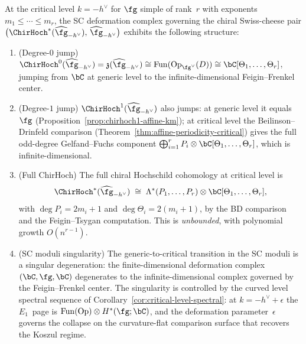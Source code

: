 \begin{conjecture}\label{conj:sc-deformation-critical}
At the critical level $k = -h^\vee$ for $\fg$ simple of rank~$r$
with exponents $m_1 \le \cdots \le m_r$, the SC deformation complex
governing the chiral Swiss-cheese pair
$\bigl(\ChirHoch^*(\widehat{\fg}_{-h^\vee}),\, \widehat{\fg}_{-h^\vee}\bigr)$
exhibits the following structure:
\begin{enumerate}[label=\textup{(\roman*)}]
\item \textup{(Degree-$0$ jump)}\quad
 $\ChirHoch^0(\widehat{\fg}_{-h^\vee})
 = \mathfrak{z}(\widehat{\fg}_{-h^\vee})
 \cong \mathrm{Fun}(\mathrm{Op}_{\fg^\vee}(D))
 \cong \bC[\Theta_1, \ldots, \Theta_r]$,
 jumping from $\bC$ at generic level to
 the infinite-dimensional Feigin--Frenkel center.
\item \textup{(Degree-$1$ jump)}\quad
 $\ChirHoch^1(\widehat{\fg}_{-h^\vee})$ also jumps: at generic level it equals~$\fg$
 \textup{(}Proposition~\textup{\ref{prop:chirhoch1-affine-km}}\textup{)};
 at critical level the Beilinson--Drinfeld comparison
 \textup{(}Theorem~\textup{\ref{thm:affine-periodicity-critical}}\textup{)}
 gives the full odd-degree Gelfand--Fuchs component
 $\bigoplus_{i=1}^{r} P_i \otimes \bC[\Theta_1, \ldots, \Theta_r]$,
 which is infinite-dimensional.
\item \textup{(Full ChirHoch)}\quad
 The full chiral Hochschild cohomology at critical level is
 \[
 \ChirHoch^*(\widehat{\fg}_{-h^\vee})
 \;\cong\;
 \Lambda^*(P_1, \ldots, P_r) \otimes \bC[\Theta_1, \ldots, \Theta_r],
 \]
 with $\deg P_i = 2m_i + 1$ and $\deg \Theta_i = 2(m_i + 1)$,
 by the BD comparison and the Feigin--Tsygan computation.
 This is \emph{unbounded}, with polynomial growth $O(n^{r-1})$.
\item \textup{(SC moduli singularity)}\quad
 The generic-to-critical transition in the SC moduli is a
 singular degeneration: the finite-dimensional deformation
 complex $(\bC, \fg, \bC)$ degenerates to the infinite-dimensional
 complex governed by the Feigin--Frenkel center.
 The singularity is controlled by the curved level spectral sequence
 of Corollary~\textup{\ref{cor:critical-level-spectral}}: at
 $k = -h^\vee + \epsilon$
 the $E_1$~page is $\mathrm{Fun}(\mathrm{Op}) \otimes H^*(\fg; \bC)$,
 and the deformation parameter~$\epsilon$ governs the collapse
 on the curvature-flat comparison surface that recovers the
 Koszul regime.
\end{enumerate}
\end{conjecture}

